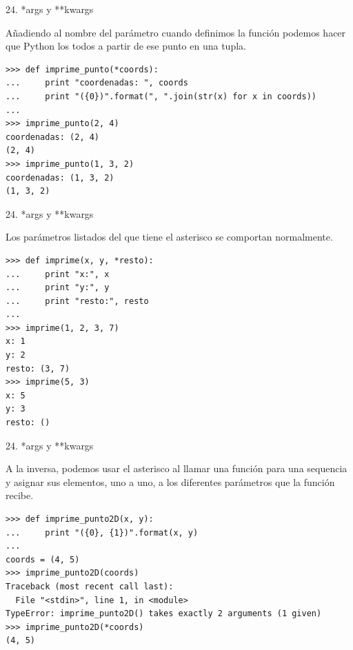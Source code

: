 \documentclass[14pt]{beamer}
\begin{document}
\begin{frame}[fragile]{24. *args y **kwargs}
  \begin{block}{}
    \small
    \centering
    Añadiendo  al nombre del parámetro cuando
    definimos la función podemos hacer que Python los
     todos a partir de ese punto en una tupla.
  \end{block}

  \begin{exampleblock}{}
    \scriptsize
    \begin{lstlisting}
>>> def imprime_punto(*coords):
...     print "coordenadas: ", coords
...     print "({0})".format(", ".join(str(x) for x in coords))
...
>>> imprime_punto(2, 4)
coordenadas: (2, 4)
(2, 4)
>>> imprime_punto(1, 3, 2)
coordenadas: (1, 3, 2)
(1, 3, 2)
    \end{lstlisting}
  \end{exampleblock}
\end{frame}

\begin{frame}[fragile]{24. *args y **kwargs}
  \begin{block}{}
    \centering
    Los parámetros listados  del que tiene el
    asterisco se comportan normalmente.
  \end{block}

  \begin{exampleblock}{}
    \scriptsize
    \begin{lstlisting}
>>> def imprime(x, y, *resto):
...     print "x:", x
...     print "y:", y
...     print "resto:", resto
...
>>> imprime(1, 2, 3, 7)
x: 1
y: 2
resto: (3, 7)
>>> imprime(5, 3)
x: 5
y: 3
resto: ()
    \end{lstlisting}
  \end{exampleblock}
\end{frame}

\begin{frame}[fragile]{24. *args y **kwargs}
  \begin{block}{}
    \small
    \centering
    A la inversa, podemos usar el asterisco al llamar una función para
     una sequencia y asignar sus elementos,
    uno a uno, a los diferentes parámetros que la función recibe.
  \end{block}

  \begin{exampleblock}{}
    \scriptsize
    \begin{lstlisting}
>>> def imprime_punto2D(x, y):
...     print "({0}, {1})".format(x, y)
...
coords = (4, 5)
>>> imprime_punto2D(coords)
Traceback (most recent call last):
  File "<stdin>", line 1, in <module>
TypeError: imprime_punto2D() takes exactly 2 arguments (1 given)
>>> imprime_punto2D(*coords)
(4, 5)
    \end{lstlisting}
  \end{exampleblock}
\end{frame}
\end{document}
